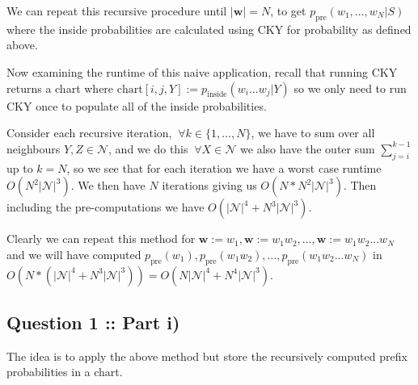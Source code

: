 \documentclass[a4paper]{article}
\begin{document}
We can repeat this recursive procedure until $|\bm{w}| = N$, to get $p_{\text{pre}}(w_1,...,w_N|S)$
where the inside probabilities are calculated using CKY for probability as defined above.

Now examining the runtime of this naive application, recall that running CKY returns
a chart where $\text{chart}[i,j,Y] := p_{\text{inside}}(w_i...w_j|Y)$ so we
only need to run CKY once to populate all of the inside probabilities.

Consider each recursive iteration, $~\forall k \in \{1,...,N\} $, we have
to sum over all neighbours $Y,Z \in \mathcal{N}$, and we do this $~\forall X \in \mathcal{N}$ 
we also have the outer sum $\sum_{j=i}^{k-1}$ up to $k=N$, so we see that for each
iteration we have a worst case runtime $O(N^2 |\mathcal{N}|^3)$.
We then have $N$ iterations giving us $O(N * N^2 |\mathcal{N}|^3)$.
Then including the pre-computations we have $O(\left| \mathcal{N}  \right|^4 + N^3 \left| \mathcal{N} \right|^3 )$.

Clearly we can repeat this method for $\bm{w}:= w_1, \bm{w}:= w_1 w_2, ..., \bm{w}:= w_1 w_2 ... w_N$ and we will
have computed $p_{\text{pre}}(w_1), p_{\text{pre}}(w_1 w_2), ..., p_{\text{pre}}(w_1 w_2 ... w_N)$ 
in $O(N * (\left| \mathcal{N} \right|^4 + N^3 \left| \mathcal{N} \right|^3)) = O(N \left| \mathcal{N} \right|^4 + N^4 \left| \mathcal{N} \right|^3)$.
\subsection*{Question 1 :: Part i)}
The idea is to apply the above method but store the recursively computed prefix
probabilities in a chart.
\end{document}
